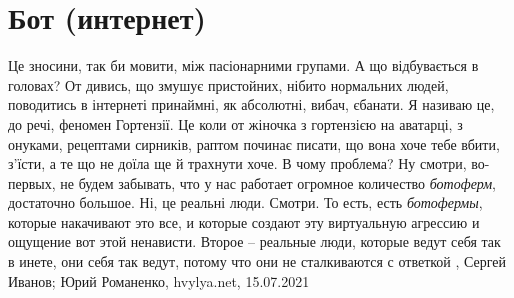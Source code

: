  
 
 
 
 
\chapter{Бот (интернет)}
\label{sec:slova.bot.internet}

Це зносини, так би мовити, між пасіонарними групами. А що відбувається в
головах? От дивись, що змушує пристойних, нібито нормальних людей, поводитись в
інтернеті принаймні, як абсолютні, вибач, єбанати.  Я називаю це, до речі,
феномен Гортензії. Це коли от жіночка з гортензією на аватарці, з онуками,
рецептами сирників, раптом починає писати, що вона хоче тебе вбити, з’їсти, а
те що не доїла ще й трахнути хоче. В чому проблема?  Ну смотри, во-первых, не
будем забывать, что у нас работает огромное количество \emph{ботоферм},
достаточно большое.  Ні, це реальні люди.  Смотри. То есть, есть
\emph{ботофермы}, которые накачивают это все, и которые создают эту виртуальную
агрессию и ощущение вот этой ненависти. Второе – реальные люди, которые ведут
себя так в инете, они себя так ведут, потому что они не сталкиваются с ответкой
, 
Сергей Иванов; Юрий Романенко, hvylya.net, 15.07.2021

